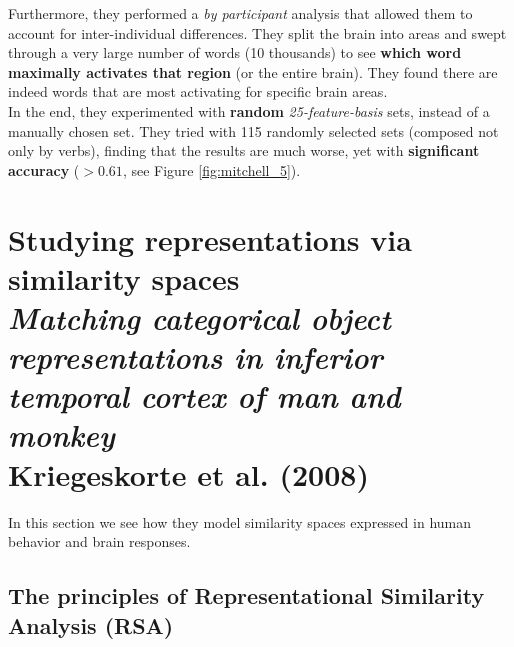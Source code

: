Furthermore, they performed a \textit{by participant} analysis that allowed them to account for inter-individual differences. They split the brain into areas and swept through a very large number of words (10 thousands) to see \textbf{which word maximally activates that region} (or the entire brain).
They found there are indeed words that are most activating for specific brain areas.\\

In the end, they experimented with \textbf{random} \textit{25-feature-basis} sets, instead of a manually chosen set. They tried with 115 randomly selected sets (composed not only by verbs), finding that the results are much worse, yet with \textbf{significant accuracy} ($>0.61$, see Figure \ref{fig:mitchell_5}).




\section[Studying representations via similarity spaces]{Studying representations via similarity spaces\\ \large{\textit{Matching categorical object representations in inferior temporal cortex of man and monkey}\\ Kriegeskorte et al. (2008)}}
\label{sec:kriegeskorte}
In this section we see how they model similarity spaces expressed in human behavior and brain responses.

\subsection{The principles of Representational Similarity Analysis (RSA)}

